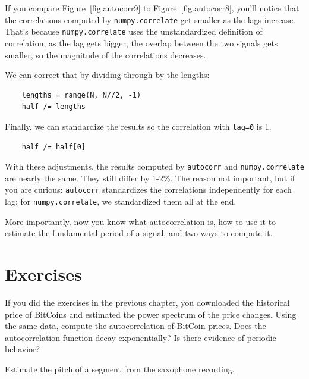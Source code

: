\documentclass[12pt]{book}
\begin{document}
If you compare Figure~\ref{fig.autocorr9} to Figure~\ref{fig.autocorr8},
you'll notice that the correlations computed by {\tt numpy.correlate}
get smaller as the lags increase.  That's because {\tt numpy.correlate}
uses the unstandardized definition of correlation;
as the lag gets bigger, the
overlap between the two signals gets smaller, so the magnitude of
the correlations decreases.

We can correct that by dividing through by the lengths:

\begin{verbatim}
    lengths = range(N, N//2, -1)
    half /= lengths
\end{verbatim}

Finally, we can standardize the results so the correlation with
{\tt lag=0} is 1.

\begin{verbatim}
    half /= half[0]
\end{verbatim}

With these adjustments, the results computed by {\tt autocorr} and
{\tt numpy.correlate} are nearly the same.  They still differ by
1-2\%.  The reason not important, but if you are curious: {\tt autocorr}
standardizes the correlations independently for each lag; for
{\tt numpy.correlate}, we standardized them all at the end.

More importantly, now you know what autocorrelation is, how to
use it to estimate the fundamental period of a signal, and two
ways to compute it.



\section{Exercises}

\begin{exercise}
If you did the exercises in the previous chapter, you downloaded
the historical price of BitCoins and estimated the power spectrum
of the price changes.  Using the same data, compute the autocorrelation
of BitCoin prices.  Does the autocorrelation function decay
exponentially?  Is there evidence of periodic behavior?
\end{exercise}

\begin{exercise}
Estimate the pitch of a segment from the saxophone recording.
\end{exercise}
\end{document}
